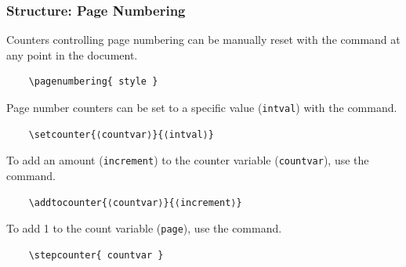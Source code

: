 \begin{frame}[fragile]
\frametitle{Structure: Page Numbering}   
\small Counters controlling page numbering can be manually reset with the  command at any point in the document. 
\begin{exampleblock}{} 
    \small
    \begin{verbatim}
    \pagenumbering{ style }
    \end{verbatim}
\end{exampleblock} \pause
\small Page number counters can be set to a specific value (\texttt{intval}) with the  command.
\begin{exampleblock}{}
    \small
    \begin{verbatim}
    \setcounter{⟨countvar⟩}{⟨intval⟩}
    \end{verbatim}
\end{exampleblock} \pause
\small To add an amount (\texttt{increment}) to the counter variable (\texttt{countvar}), use the  command.
\begin{exampleblock}{}
    \small
    \begin{verbatim}
    \addtocounter{⟨countvar⟩}{⟨increment⟩}
    \end{verbatim}
\end{exampleblock} \pause
\small To add 1 to the count variable (\texttt{page}), use the  command.
\begin{exampleblock}{}
    \small
    \begin{verbatim}
    \stepcounter{ countvar }
    \end{verbatim}
\end{exampleblock} 
\end{frame}


